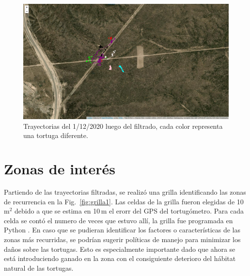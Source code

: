  
\begin{figure}[ht]
    \begin{center}
       
   
    \includegraphics[width=\imsize]{Chap2/Traye1_12_conF.png}
\end{center}
    \caption[Trayectorias un dia de medición, después del filtrado.]{Trayectorias del 1/12/2020 luego del filtrado, cada color representa una tortuga diferente.}
    \label{fig:trayeConFiltr}
\end{figure}
 
\section{Zonas de interés}
Partiendo de las trayectorias filtradas, se realizó  una grilla identificando las zonas de recurrencia en la Fig.~\ref{fig:grilla1}. Las celdas de la grilla fueron elegidas de 10\,m$^2$ debido a que se estima en 10\,m el erorr del GPS del tortugómetro. Para cada celda se contó el numero de veces que estuvo allí, la grilla fue programada en Python \cite{github}. En caso que se pudieran identificar los factores o características de las zonas más recurridas, se podrían sugerir políticas de manejo para minimizar los daños sobre las tortugas. Esto es especialmente importante dado que ahora se está introduciendo ganado en la zona con el consiguiente deterioro del hábitat natural de las tortugas.
 
